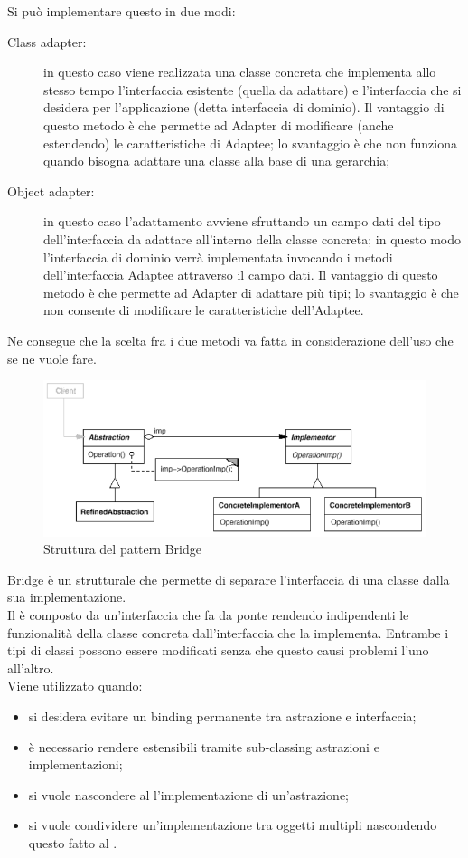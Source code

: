 Si può implementare questo  in due modi:
\begin{description}
\item[Class adapter:] in questo caso viene realizzata una classe concreta che implementa allo stesso tempo l'interfaccia esistente (quella da adattare) e l'interfaccia che si desidera per l'applicazione (detta interfaccia di dominio). Il vantaggio di questo metodo è che permette ad Adapter di modificare (anche estendendo) le caratteristiche di Adaptee; lo svantaggio è che non funziona quando bisogna adattare una classe alla base di una gerarchia;
\item[Object adapter:] in questo caso l'adattamento avviene sfruttando un campo dati del tipo dell'interfaccia da adattare all'interno della classe concreta; in questo modo l'interfaccia di dominio verrà implementata invocando i metodi dell'interfaccia Adaptee attraverso il campo dati. Il vantaggio di questo metodo è che permette ad Adapter di adattare più tipi; lo svantaggio è che non consente di modificare le caratteristiche dell'Adaptee.
\end{description}
Ne consegue che la scelta fra i due metodi va fatta in considerazione dell'uso che se ne vuole fare.

 \label{app:bridge}
	\begin{figure}[H]\centering
    \includegraphics[scale=0.7]{SpecificaTecnica/Pics/Bridge}
    \caption{Struttura del pattern Bridge}
	\end{figure}
Bridge è un  strutturale che permette di separare l’interfaccia di una classe dalla sua implementazione. \\
Il  è composto da un’interfaccia che fa da ponte rendendo indipendenti le funzionalità della classe concreta dall’interfaccia che la implementa. Entrambe i tipi di classi possono essere modificati senza che questo causi problemi l’uno all’altro. \\
Viene utilizzato quando:
\begin{itemize}
\item si desidera evitare un binding permanente tra astrazione e interfaccia;
\item è necessario rendere estensibili tramite sub-classing astrazioni e implementazioni;
\item si vuole nascondere al  l'implementazione di un'astrazione;
\item si vuole condividere un'implementazione tra oggetti multipli nascondendo questo fatto al .
\end{itemize}

